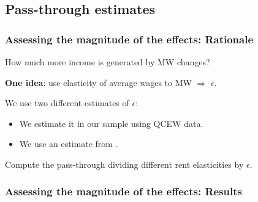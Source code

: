 \subsection{Pass-through estimates}
\begin{frame}
	\frametitle{Assessing the magnitude of the effects: Rationale} 
	
	How much more income is generated by MW changes?
	
	\pause
	\vspace{2mm}
	\textbf{One idea}: use elasticity of average wages to MW $\Rightarrow$ $\epsilon$.
	
	\pause 
	\vspace{3mm}
	We use two different estimates of $\epsilon$:
	\begin{itemize}
		\item We estimate it in our sample using QCEW data.
		\item We use an estimate from \textcite{CegnizEtAl2019}.
	\end{itemize}

	\pause 
	\vspace{3mm}
	Compute the pass-through dividing different rent elasticities by $\epsilon$.
\end{frame}

\begin{frame}
	\frametitle{Assessing the magnitude of the effects: Results}
	\begin{table} \centering
		\scalebox{.75}
		{}
	\end{table}
	
\end{frame}

